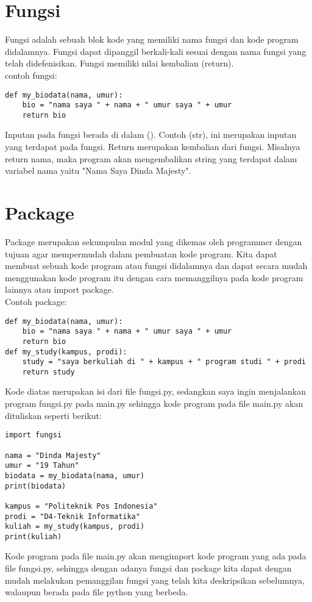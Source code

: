 \section{Fungsi}
Fungsi adalah sebuah blok kode yang memiliki nama fungsi dan kode program didalamnya. Fungsi dapat dipanggil berkali-kali sesuai dengan nama fungsi yang telah didefenisikan. Fungsi memiliki nilai kembalian (return).\\
contoh fungsi:
\begin{verbatim}
def my_biodata(nama, umur):
    bio = "nama saya " + nama + " umur saya " + umur
    return bio
\end{verbatim}
Inputan pada fungsi berada di dalam (). Contoh (str), ini merupakan inputan yang terdapat pada fungsi. Return merupakan kembalian dari fungsi. Misalnya return nama, maka program akan mengembalikan string yang terdapat dalam variabel nama yaitu "Nama Saya Dinda Majesty".

\section{Package}
Package merupakan sekumpulan modul yang dikemas oleh programmer dengan tujuan agar mempermudah dalam pembuatan kode program. Kita dapat membuat sebuah kode program atau fungsi didalamnya dan dapat secara mudah menggunakan kode program itu dengan cara memanggilnya pada kode program lainnya atau import package.\\
Contoh package:
\begin{verbatim}
def my_biodata(nama, umur):
    bio = "nama saya " + nama + " umur saya " + umur
    return bio
def my_study(kampus, prodi):
	study = "saya berkuliah di " + kampus + " program studi " + prodi
	return study
\end{verbatim}
Kode diatas merupakan isi dari file fungsi.py, sedangkan saya ingin menjalankan program fungsi.py pada main.py sehingga kode program pada file main.py akan dituliskan seperti berikut:
\begin{verbatim}
import fungsi

nama = "Dinda Majesty"
umur = "19 Tahun"
biodata = my_biodata(nama, umur)
print(biodata)

kampus = "Politeknik Pos Indonesia"
prodi = "D4-Teknik Informatika"
kuliah = my_study(kampus, prodi)
print(kuliah)
\end{verbatim}
Kode program pada file main.py akan mengimport kode program yang ada pada file fungsi.py, sehingga dengan adanya fungsi dan package kita dapat dengan mudah melakukan pemanggilan fungsi yang telah kita deskripsikan sebelumnya, walaupun berada pada file python yang berbeda.


